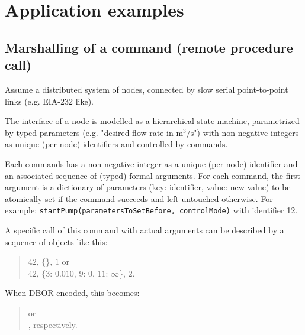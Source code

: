 
\section{Application examples}
\label{sec:applicationexamples}

\subsection{Marshalling of a command (remote procedure call)}

Assume a distributed system of nodes, connected by slow serial point-to-point links (e.g. EIA-232 like).

The interface of a node is modelled as a hierarchical state machine, parametrized by typed parameters
(e.g. "desired flow rate in $\text{m}^3/\text{s}$") with non-negative integers as unique (per node) identifiers
and controlled by commands.

Each commands has a non-negative integer as a unique (per node) identifier and an associated sequence of
(typed) formal arguments.
For each command, the first argument is a dictionary of parameters (key: identifier, value: new value) to be
atomically set if the command succeeds and left untouched otherwise.
For example: \texttt{startPump(parametersToSetBefore, controlMode)} with identifier 12.

\medskip
\begin{BeginParPenalty}
    A specific call of this command with actual arguments can be described by a sequence of objects like this:
    \begin{quote}
        $42$, \{\}, $1$ or \\
        $42$, \{$3$: $0.010$, $9$: $0$, $11$: $\infty$\}, $2$.
    \end{quote}
\end{BeginParPenalty}

\begin{BeginParPenalty}
    When DBOR-encoded, this becomes:
    \begin{quote}
        or \\
        \ByteSequence{
            \DborFirstByteHex{Number}{0C},
            \DborFirstByteHex{Dictionary}{A7}, %
                \DborFirstByteHex{Number}{03},
                \DborFirstByteHex{Number}{E9}, \DborNextByteHex{01},
                \DborFirstByteHex{Number}{09},
                \DborFirstByteHex{Number}{00},
                \DborFirstByteHex{Number}{0B},
                \DborFirstByteHex{Numberlike}{FE},
            \DborFirstByteHex{Number}{02}
        }, respectively.
    \end{quote}
\end{BeginParPenalty}


